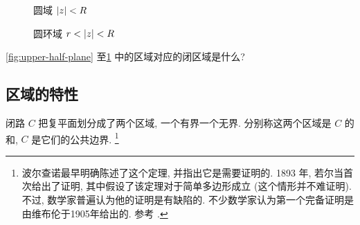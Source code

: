 \begin{figure}[H]
  \centering
  \begin{minipage}{.43\textwidth}
    \centering
    \caption{圆域 $\lvert z\rvert<R$}
  \end{minipage}
  \begin{minipage}{.43\textwidth}
    \centering
    \caption{圆环域 $r<\lvert z\rvert<R$}
    \label{fig:anulus-domain}
  \end{minipage}
\end{figure}


\begin{exercise}
  \ref{fig:upper-half-plane} 至\ref{fig:anulus-domain} 中的区域对应的闭区域是什么?
\end{exercise}


\subsection{区域的特性}


闭路 $C$ 把复平面划分成了两个区域, 一个有界一个无界.
分别称这两个区域是 $C$ 的和, $C$ 是它们的公共边界.
\footnote{波尔查诺最早明确陈述了这个定理, 并指出它是需要证明的. 1893 年, 若尔当首次给出了证明, 其中假设了该定理对于简单多边形成立 (这个情形并不难证明). 不过, 数学家普遍认为他的证明是有缺陷的. 不少数学家认为第一个完备证明是由维布伦于1905年给出的. 参考 \cite{BergJulianMinesRichman1975}.}

